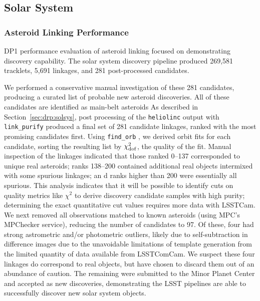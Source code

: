 \subsection{Solar System}
\label{sec:performance:solsys}

\subsubsection{Asteroid Linking Performance}

\gls{DP1} performance evaluation of asteroid linking focused on demonstrating discovery capability.
The solar system discovery \gls{pipeline} produced 269,581 tracklets, 5,691 linkages, and 281 post-processed candidates.

We performed a conservative manual investigation of these 281 candidates, producing a curated list of \nnewasteroiddiscoveries probable new asteroid discoveries.
All of these candidates are identified as main-belt asteroids
As described in Section~\ref{sec:drp:solsys}, post processing of the {\tt heliolinc} output with {\tt link\_purify} produced a final set of 281 candidate linkages, ranked with the most promising candidates first.
Using {\tt find\_orb} \citep{findorb}, we derived orbit fits for each candidate, sorting the resulting list by $\chi_{\rm dof}^2$, the quality of the fit.
Manual inspection of the linkages indicated that those ranked 0--137 corresponded to unique real asteroids; ranks 138--200 contained additional real objects intermixed with some spurious linkages; an d ranks higher than 200 were essentially all spurious.
This analysis indicates that it will be possible to identify cuts on quality metrics like $\chi^2$ to derive discovery candidate samples with high purity; determining the exact quantitative cut values requires more data with \gls{LSSTCam}.
We next removed all observations matched to known asteroids (using \gls{MPC}'s MPChecker service), reducing the number of candidates to 97.
Of these, four had strong astrometric and/or photometric outliers, likely due to self-subtraction in difference images due to the unavoidable limitations of template generation from the limited quantity of data available from  \gls{LSSTComCam}.
We suspect these four linkages do correspond to real objects, but have chosen to discard them out of an abundance of caution.
The remaining \nnewasteroiddiscoveries were submitted to the Minor Planet Center and accepted as new discoveries, demonstrating the \gls{LSST} pipelines are able to successfully discover new solar system objects.

